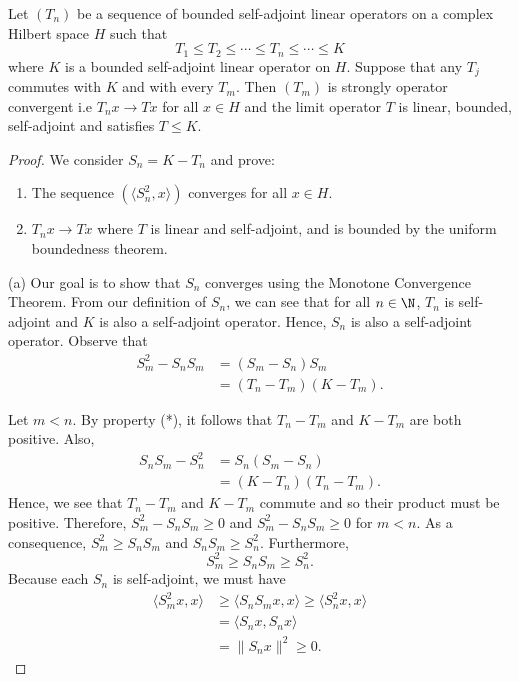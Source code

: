 \begin{theorem}\label{9.3-3}
    Let \( ({T}_{n}) \) be a sequence of bounded self-adjoint linear operators on a complex Hilbert space \( H \) such that  \[  {T}_{1} \leq {T}_{2} \leq \cdots \leq {T}_{n} \leq \cdots \leq K \tag{*}  \]
   where \( K   \) is a bounded self-adjoint linear operator on \( H  \). Suppose that any \( {T}_{j} \) commutes with \( K  \) and with every \( {T}_{m} \). Then \( ({T}_{m}) \) is strongly operator convergent i.e \( {T}_{n}x \to Tx \) for all \( x \in H \) and the limit operator \( T  \) is linear, bounded, self-adjoint and satisfies \( T \leq K  \).
\end{theorem}
\begin{proof}
We consider \( {S}_{n} = K - {T}_{n} \) and prove:
\begin{enumerate}
    \item[(a)] The sequence \( (\langle {S}_{n}^{2} , x  \rangle ) \) converges for all \( x \in H  \).
    \item[(b)] \( {T}_{n}x \to Tx  \) where \( T  \) is linear and self-adjoint, and is bounded by the uniform boundedness theorem.
\end{enumerate}

(a) Our goal is to show that \( {S}_{n} \) converges using the Monotone Convergence Theorem. From our definition of \( {S}_{n} \), we can see that for all \( n \in \N  \), \( {T}_{n} \) is self-adjoint and \( K  \) is also a self-adjoint operator. Hence, \( {S}_{n}  \) is also a self-adjoint operator. Observe that
\begin{align*}
    {S}_{m}^{2} - {S}_{n} {S}_{m} &= ({S}_{m} - {S}_{n}) {S}_{m}     \\
                                  &= ({T}_{n} - {T}_{m})(K - {T}_{m}).
\end{align*}

Let \( m < n  \). By property (*), it follows that \( {T}_{n} - {T}_{m} \) and \( K - {T}_{m} \) are both positive. Also,  
\begin{align*}  {S}_{n}{S}_{m} - {S}_{n}^{2} &= {S}_{n}({S}_{m} - {S}_{n}) \\  
    &= (K - {T}_{n}) ({T}_{n} - {T}_{m}).  
\end{align*}
Hence, we see that \( {T}_{n} - {T}_{m} \) and \( K - {T}_{m} \) commute and so their product must be positive. Therefore, \( {S}_{m}^{2} - {S}_{n} {S}_{m} \geq 0   \) and \( {S}_{m}^{2} - {S}_{n}{S}_{m} \geq 0  \) for \( m < n  \). As a consequence, \( {S}_{m}^{2} \geq {S}_{n} {S}_{m} \) and \( {S}_{n} {S}_{m} \geq {S}_{n}^{2} \). Furthermore, 
\[  {S}_{m}^{2} \geq {S}_{n} {S}_{m} \geq {S}_{n}^{2}. \]
Because each \( {S}_{n} \) is self-adjoint, we must have
\begin{align*}
    \langle {S}_{m}^{2} x  ,  x  \rangle &\geq \langle {S}_{n}{S}_{m} x  ,  x  \rangle \geq \langle {S}_{n}^{2} x   , x   \rangle  \\
                                         &= \langle {S}_{n} x  , {S}_{n} x  \rangle \\
                                         &= \|{S}_{n}x\|^{2} \geq 0. 
\end{align*}


\end{proof}
